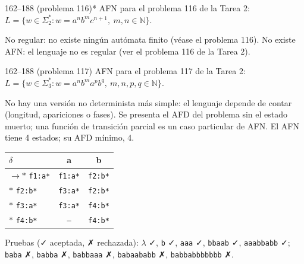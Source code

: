 \documentclass[11pt]{article}
\begin{document}
\begin{ejercicio}{162--188 (problema 116)}{*}
AFN para el problema 116 de la Tarea 2: $L = \{w \in \Sigma_2^* : w = a^n b^m c^{n+1},\ m, n \in \mathbb{N}\}$.
\end{ejercicio}
\proc No regular: no existe ningún autómata finito (véase el problema 116).
\resp No existe AFN: el lenguaje no es regular (ver el problema 116 de la Tarea 2).


\begin{ejercicio}{162--188 (problema 117)}{}
AFN para el problema 117 de la Tarea 2: $L = \{w \in \Sigma_3^* : w = a^n b^m a^p b^q,\ m, n, p, q \in \mathbb{N}\}$.
\end{ejercicio}
\proc No hay una versión no determinista más simple: el lenguaje depende de contar (longitud, apariciones o fases). Se presenta el AFD del problema sin el estado muerto; una función de transición parcial es un caso particular de AFN. El AFN tiene 4 estados; su AFD mínimo, 4.
\begin{center}\small\begin{tabular}{lcc}\toprule
$\delta$ & a & b \\\midrule
$\to$$*$ \texttt{f1:a*} & \texttt{f1:a*} & \texttt{f2:b*} \\
$*$ \texttt{f2:b*} & \texttt{f3:a*} & \texttt{f2:b*} \\
$*$ \texttt{f3:a*} & \texttt{f3:a*} & \texttt{f4:b*} \\
$*$ \texttt{f4:b*} & \texttt{--} & \texttt{f4:b*} \\
\bottomrule\end{tabular}\end{center}
Pruebas (✓ aceptada, ✗ rechazada): $\lambda$ ✓, \texttt{b} ✓, \texttt{aaa} ✓, \texttt{bbaab} ✓, \texttt{aaabbabb} ✓; \texttt{baba} ✗, \texttt{babba} ✗, \texttt{babbaaa} ✗, \texttt{babaababb} ✗, \texttt{babbabbbbbbb} ✗.
\end{document}
